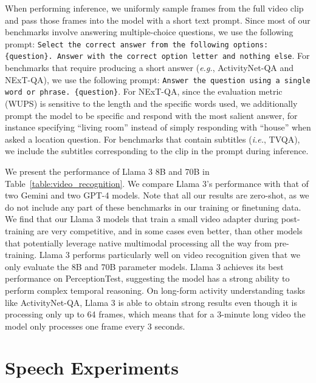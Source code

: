 When performing inference, we uniformly sample frames from the full video clip and pass those frames into the model with a short text prompt. Since most of our benchmarks involve answering multiple-choice questions, we use the following prompt: {\tt Select the correct answer from the following options: \{question\}.  Answer with the correct option letter and nothing else}. For benchmarks that require producing a short answer ({\em e.g.}, ActivityNet-QA and NExT-QA), we use the following prompt: {\tt Answer the question using a single word or phrase. \{question\}}. For NExT-QA, since the evaluation metric (WUPS) is sensitive to the length and the specific words used, we additionally prompt the model to be specific and respond with the most salient answer, for instance specifying ``living room'' instead of simply responding with ``house'' when asked a location question. For benchmarks that contain subtitles ({\em i.e.}, TVQA), we include the subtitles corresponding to the clip in the prompt during inference.

We present the performance of Llama 3 8B and 70B in Table~\ref{table:video_recognition}.
We compare Llama 3's performance with that of two Gemini and two GPT-4 models. Note that all our results are zero-shot, as we do not include any part of these benchmarks in our training or finetuning data. We find that our Llama 3 models that train a small video adapter during post-training are very competitive, and in some cases even better, than other models that potentially leverage native multimodal processing all the way from pre-training. Llama 3 performs particularly well on video recognition given that we only evaluate the 8B and 70B parameter models. Llama 3 achieves its best performance on PerceptionTest, suggesting the model has a strong ability to perform complex temporal reasoning.  On long-form activity understanding tasks like ActivityNet-QA, Llama 3 is able to obtain strong results even though it is processing only up to 64 frames, which means that for a 3-minute long video the model only processes one frame every 3 seconds.

\section{Speech Experiments}
\label{section:speech}

